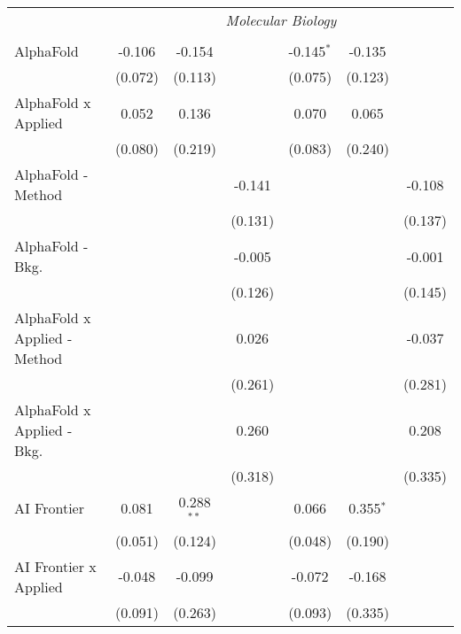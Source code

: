 \begin{tabular}{lcccccc}
 & \multicolumn{6}{c}{\textit{Molecular Biology}} \\ \\
   AlphaFold                      & -0.106  & -0.154         &         & -0.145$^{*}$ & -0.135        &   \\   
                                  & (0.072) & (0.113)        &         & (0.075)      & (0.123)       &   \\   
   AlphaFold x Applied            & 0.052   & 0.136          &         & 0.070        & 0.065         &   \\   
                                  & (0.080) & (0.219)        &         & (0.083)      & (0.240)       &   \\   
   AlphaFold - Method             &         &                & -0.141  &              &               & -0.108\\   
                                  &         &                & (0.131) &              &               & (0.137)\\   
   AlphaFold - Bkg.               &         &                & -0.005  &              &               & -0.001\\   
                                  &         &                & (0.126) &              &               & (0.145)\\   
   AlphaFold x Applied - Method   &         &                & 0.026   &              &               & -0.037\\   
                                  &         &                & (0.261) &              &               & (0.281)\\   
   AlphaFold x Applied - Bkg.     &         &                & 0.260   &              &               & 0.208\\   
                                  &         &                & (0.318) &              &               & (0.335)\\   
   AI Frontier                    & 0.081   & 0.288$^{**}$   &         & 0.066        & 0.355$^{*}$   &   \\   
                                  & (0.051) & (0.124)        &         & (0.048)      & (0.190)       &   \\   
   AI Frontier x Applied          & -0.048  & -0.099         &         & -0.072       & -0.168        &   \\   
                                  & (0.091) & (0.263)        &         & (0.093)      & (0.335)       &   \\   

\end{tabular}
